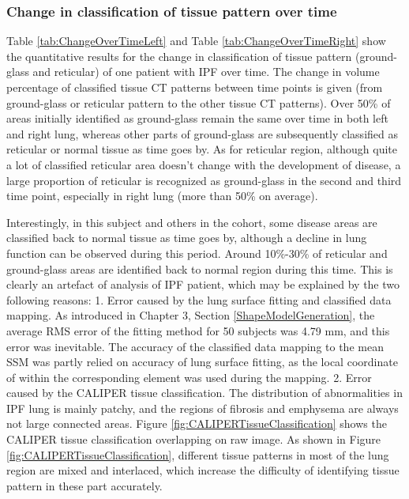 \subsubsection{Change in classification of tissue pattern over time}
Table \ref{tab:ChangeOverTimeLeft} and Table \ref{tab:ChangeOverTimeRight} show the quantitative results for the change in classification of tissue pattern (ground-glass and reticular) of one patient with IPF over time. The change in volume percentage of classified tissue CT patterns between time points is given (from ground-glass or reticular pattern to the other tissue CT patterns). Over 50\% of areas initially identified as ground-glass remain the same over time in both left and right lung, whereas other parts of ground-glass are subsequently classified as reticular or normal tissue as time goes by. As for reticular region, although quite a lot of classified reticular area doesn't change with the development of disease, a large proportion of reticular is recognized as ground-glass in the second and third time point, especially in right lung (more than 50\% on average). 

Interestingly, in this subject and others in the cohort, some disease areas are classified back to normal tissue as time goes by, although a decline in lung function can be observed during this period. Around 10\%-30\% of reticular and ground-glass areas are identified back to normal region during this time. This is clearly an artefact of analysis of IPF patient, which may be explained by the two following reasons: 1. Error caused by the lung surface fitting and classified data mapping. As introduced in Chapter 3, Section \ref{ShapeModelGeneration}, the average RMS error of the fitting method for 50 subjects was 4.79 mm, and this error was inevitable. The accuracy of the classified data mapping to the mean SSM was partly relied on accuracy of lung surface fitting, as the local coordinate of within the corresponding element was used during the mapping. 2. Error caused by the CALIPER tissue classification. The distribution of abnormalities in IPF lung is mainly patchy, and the regions of fibrosis and emphysema are always not large connected areas. Figure \ref{fig:CALIPERTissueClassification} shows the CALIPER tissue classification overlapping on raw image. As shown in Figure \ref{fig:CALIPERTissueClassification}, different tissue patterns in most of the lung region are mixed and interlaced, which increase the difficulty of identifying tissue pattern in these part accurately.

